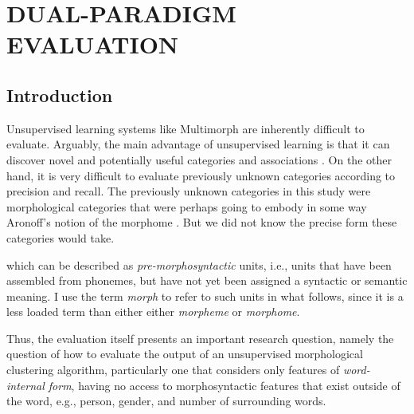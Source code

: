 \chapter{DUAL-PARADIGM EVALUATION}
\label{ch:eval}

\section{Introduction}

Unsupervised learning systems like Multimorph are inherently difficult to evaluate. 
Arguably, the main advantage of unsupervised learning is that it can discover novel and potentially useful categories and associations \citep{parsons:2004}. 
On the other hand, it is very difficult to evaluate previously unknown 
categories according to precision and recall. %
The previously unknown categories in this study were morphological 
categories that were perhaps going to embody in some way Aronoff's notion of the morphome \citep{aronoff:1994}.  But we did not know the precise form these categories would take. 


which can be described as 
\emph{pre-morphosyntactic} units, i.e., units that have been assembled from 
phonemes, but have not yet been assigned 
a syntactic or semantic meaning. I use the term \emph{morph} to refer to such units in what follows, since it is a less loaded term than either
either \emph{morpheme} or \emph{morphome}.

Thus, the evaluation itself presents an important research question, namely the question 
of how to evaluate the output of an unsupervised morphological clustering algorithm, 
particularly one that considers only features of \emph{word-internal form}, having no 
access to morphosyntactic features that exist outside of the word, e.g., person, gender, and 
number of surrounding words.

